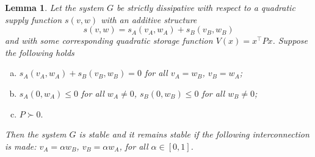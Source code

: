 \documentclass[11pt,a4paper,oneside,DIV=12,headings=small]{scrartcl}
\newtheorem{lemma}[theorem]{Lemma}
\theoremstyle{plain}
\begin{document}
\begin{lemma}
\label{LemmaRobust}
Let the system $G$ be strictly dissipative with respect to a quadratic supply function $s(v,w)$ with an additive structure 
\begin{equation}
s(v,w)=s_A(v_A,w_A)+s_B(v_B,w_B)
\end{equation}
and with some corresponding quadratic storage function $V(x)=x^\top P x$. Suppose the following holds
\begin{enumerate}[a)]
\item $s_A(v_A,w_A)+s_B(v_B,w_B)=0$ for all $v_A=w_B$, $v_B=w_A$;
\item $s_A(0,w_A)\leq 0$ for all $w_A \neq 0$, $s_B(0,w_B)\leq 0$ for all $w_B \neq 0$;
\item $P \succ 0.$ 
\end{enumerate}
Then the system $G$ is stable and it remains stable if the following interconnection is made: $v_A=\alpha w_B$, $v_B=\alpha w_A$, for all $\alpha \in [0,1]$.
\end{lemma} 
\end{document}
